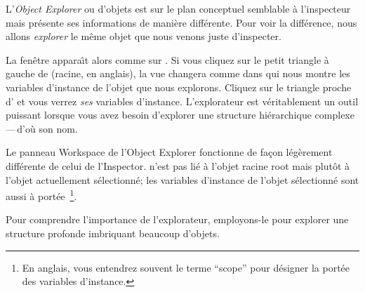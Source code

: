 \documentclass[a4paper,10pt,twoside]{book}
\begin{document}
L'\emph{Object Explorer} ou  d'objets est sur le plan conceptuel semblable \`a l'inspecteur mais pr\'esente ses informations de mani\`ere diff\'erente.
Pour voir la diff\'erence, nous allons \emph{explorer} le m\^eme objet
que nous venons juste d'inspecter.

La fen\^etre  appara\^{\i}t alors comme sur
 .
Si vous cliquez sur le petit triangle \`a gauche de  (racine, en anglais), la vue changera comme dans  qui
nous montre les variables d'instance de l'objet que nous explorons.
Cliquez sur le triangle proche d' et vous verrez
\emph{ses} variables d'instance.
L'explorateur est v\'eritablement un outil puissant lorsque vous avez besoin
d'explorer une structure hi\'erarchique complexe\,---\,d'o\`u son nom.

Le panneau Workspace de l'Object Explorer fonctionne de fa\c{c}on
 l\'eg\`erement diff\'erente de celui de l'Inspector.
 n'est pas li\'e \`a l'objet racine root mais plut\^ot
\`a l'objet actuellement s\'electionn\'e; les variables d'instance de
l'objet s\'electionn\'e sont aussi \`a port\'ee~\footnote{En anglais, vous
entendrez souvent le terme ``scope'' pour d\'esigner la port\'ee des
variables d'instance.}.

Pour comprendre l'importance de l'explorateur, employons-le pour
explorer une structure profonde imbriquant beaucoup d'objets.

\end{document}
